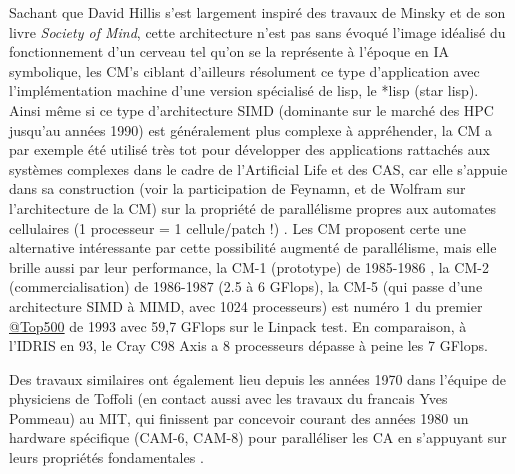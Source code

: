 Sachant que David Hillis s'est largement inspiré des travaux de Minsky et de son livre \textit{Society of Mind}, cette architecture n'est pas sans évoqué l'image idéalisé du fonctionnement d'un cerveau tel qu'on se la représente à l'époque en IA symbolique, les CM's ciblant d'ailleurs résolument ce type d'application avec l'implémentation machine d'une version spécialisé de lisp, le *lisp (star lisp). Ainsi même si ce type d’architecture SIMD (dominante sur le marché des HPC jusqu’au années 1990) est généralement plus complexe à appréhender, la CM a par exemple été utilisé très tot pour développer des applications rattachés aux systèmes complexes dans le cadre de l’Artificial Life et des CAS, car elle s’appuie dans sa construction (voir la participation de Feynamn, et de Wolfram sur l'architecture de la CM) sur la propriété de parallélisme propres aux automates cellulaires (1 processeur = 1 cellule/patch !) . Les CM proposent certe une alternative intéressante par cette possibilité augmenté de parallélisme, mais elle brille aussi par leur performance, la CM-1 (prototype) de 1985-1986 , la CM-2 (commercialisation) de 1986-1987 (2.5 à 6 GFlops), la CM-5 (qui passe d'une architecture SIMD à MIMD, avec 1024 processeurs) est numéro 1 du premier \href{http://www.top500.org/featured/systems/cm-5-los-alamos-national-lab/}{@Top500} de 1993 avec 59,7 GFlops sur le Linpack test. En comparaison, à l'IDRIS en 93, le Cray C98 Axis a 8 processeurs dépasse à peine les 7 GFlops.

Des travaux similaires ont également lieu depuis les années 1970 dans l’équipe de physiciens de Toffoli (en contact aussi avec les travaux du francais Yves Pommeau) au MIT, qui finissent par concevoir courant des années 1980 un hardware spécifique (CAM-6, CAM-8) pour paralléliser les CA en s’appuyant sur leurs propriétés fondamentales . 

